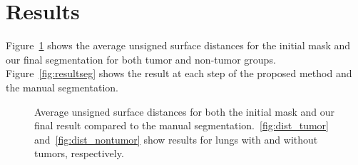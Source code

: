 \documentclass{llncs}
\begin{document}
%
\section{Results}
%
Figure~\ref{fig:dist} shows the average unsigned surface distances for the initial mask and our final segmentation for both tumor and non-tumor groups. Figure~\ref{fig:resultseg} shows the result at each step of the proposed method and the manual segmentation. 
\begin{figure}[ht!]
  \centering
  \caption{Average unsigned surface distances for both the initial mask and our final result compared to the manual segmentation.~\ref{fig:dist_tumor} and~\ref{fig:dist_nontumor} show results for lungs with and without tumors, respectively.}
  \label{fig:dist}
\end{figure}
\end{document}
